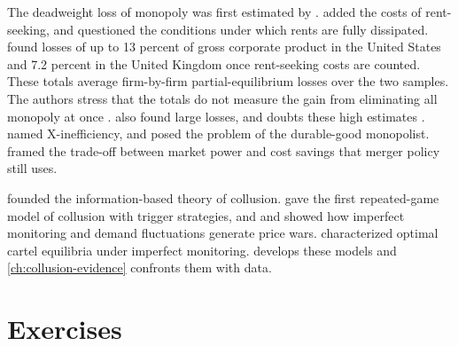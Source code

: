 The deadweight loss of monopoly was first estimated by \citet{Harberger1954}. \citet{Posner1975} added the costs of
rent-seeking, and \citet{Fisher1985} questioned the conditions under which rents are fully dissipated.
\citet[pp.~739 and 743]{CowlingMueller1978} found losses of up to 13 percent of gross corporate product in the
United States and 7.2 percent in the United Kingdom once rent-seeking costs are counted. These totals average
firm-by-firm partial-equilibrium losses over the two samples. The authors stress that the totals do not measure the
gain from eliminating all monopoly at once \citep[p.~739]{CowlingMueller1978}. \citet{JennyWeber1983} also
found large losses, and \citet{Scherer1980} doubts these high estimates \citep[sec.~1.1.1.2]{Tirole1988}.
\citet{Leibenstein1966} named X-inefficiency, and \citet{Coase1972} posed the problem of
the durable-good monopolist. \citet{Williamson1968} framed the trade-off between market power and cost savings that
merger policy still uses.

\citet{Stigler1964} founded the information-based theory of collusion. \citet{Friedman1971} gave the first
repeated-game model of collusion with trigger strategies, and \citet{GreenPorter1984} and
\citet{RotembergSaloner1986} showed how imperfect monitoring and demand fluctuations generate price wars.
\citet{AbreuPearceStacchetti1986} characterized optimal cartel equilibria under imperfect monitoring.  develops these models
and \cref{ch:collusion-evidence} confronts them with data.

\section{Exercises}\label{sec:02-exercises}

